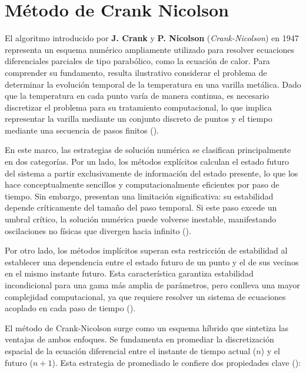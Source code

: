 \documentclass[
  spanish,
  us-letterpaper,
]{scrreprt}
\theoremstyle{definition}
\theoremstyle{plain}
\theoremstyle{remark}
\begin{document}
\chapter{Método de Crank Nicolson}\label{muxe9todo-de-crank-nicolson}

El algoritmo introducido por \textbf{J. Crank} y \textbf{P. Nicolson}
(\emph{Crank-Nicolson}) en 1947 representa un esquema numérico
ampliamente utilizado para resolver ecuaciones diferenciales parciales
de tipo parabólico, como la ecuación de calor. Para comprender su
fundamento, resulta ilustrativo considerar el problema de determinar la
evolución temporal de la temperatura en una varilla metálica. Dado que
la temperatura en cada punto varía de manera continua, es necesario
discretizar el problema para su tratamiento computacional, lo que
implica representar la varilla mediante un conjunto discreto de puntos y
el tiempo mediante una secuencia de pasos finitos
().

En este marco, las estrategias de solución numérica se clasifican
principalmente en dos categorías. Por un lado, los métodos explícitos
calculan el estado futuro del sistema a partir exclusivamente de
información del estado presente, lo que los hace conceptualmente
sencillos y computacionalmente eficientes por paso de tiempo. Sin
embargo, presentan una limitación significativa: su estabilidad depende
críticamente del tamaño del paso temporal. Si este paso excede un umbral
crítico, la solución numérica puede volverse inestable, manifestando
oscilaciones no físicas que divergen hacia infinito
().

Por otro lado, los métodos implícitos superan esta restricción de
estabilidad al establecer una dependencia entre el estado futuro de un
punto y el de sus vecinos en el mismo instante futuro. Esta
característica garantiza estabilidad incondicional para una gama más
amplia de parámetros, pero conlleva una mayor complejidad computacional,
ya que requiere resolver un sistema de ecuaciones acoplado en cada paso
de tiempo ().

El método de Crank-Nicolson surge como un esquema híbrido que sintetiza
las ventajas de ambos enfoques. Se fundamenta en promediar la
discretización espacial de la ecuación diferencial entre el instante de
tiempo actual (\(n\)) y el futuro (\(n+1\)). Esta estrategia de
promediado le confiere dos propiedades clave
():
\end{document}
